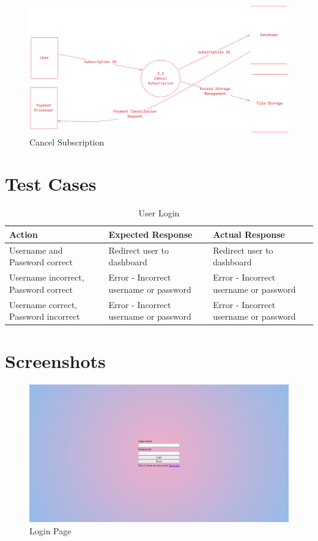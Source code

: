 \documentclass[12pt,a4paper]{report}
\begin{document}
\begin{figure}[H]
	\includegraphics[width=\textwidth]{dfd-L2-cancel_subscription.png}
	\caption{Cancel Subscription}
\end{figure}

\newpage
\chapter{Test Cases}\label{cha:test_cases}
\begin{table}[H]
	\raggedright
	\centering
	\caption{User Login}
	\begin{tabular}{|p{}|p{}|p{}|}
		\hline
		Action                               & Expected Response                      & Actual Response                        \\
		\hline
		Username and Password correct        & Redirect user to dashboard             & Redirect user to dashboard             \\
		\hline
		Username incorrect, Password correct & Error - Incorrect username or password & Error - Incorrect username or password \\
		\hline
		Username correct, Password incorrect & Error - Incorrect username or password & Error - Incorrect username or password \\
		\hline
	\end{tabular}
\end{table}
\newpage
\chapter{Screenshots}\label{cha:screenshots}
\begin{figure}[H]
	\includegraphics[width=\textwidth]{login-empty.jpeg}
	\caption{Login Page}
\end{figure}
\newpage
\end{document}
